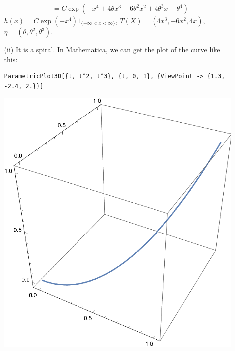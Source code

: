 \begin{solution}
\begin{enumerate}[(a)]
\begin{enumerate}[(a)]
\[\begin{aligned}
                    &=C\exp\left(-x^4+4\theta x^3-6\theta^2x^2+4\theta^3x-\theta^4\right)
                \end{aligned}
            \]
            $h(x)=C\exp(-x^4)1_{\{-\infty<x<\infty\}}$, $T(X)=(4x^3, -6x^2, 4x)$, $\eta=(\theta, \theta^2, \theta^3)$. 
            \item[(ii)] It is a spiral. In Mathematica, we can get the plot of the curve like this: 
\begin{verbatim}
ParametricPlot3D[{t, t^2, t^3}, {t, 0, 1}, {ViewPoint -> {1.3, -2.4, 2.}}]
\end{verbatim}            
            \includegraphics{1.8.c.eps}
        \end{enumerate}
    \end{enumerate}
\end{solution}

